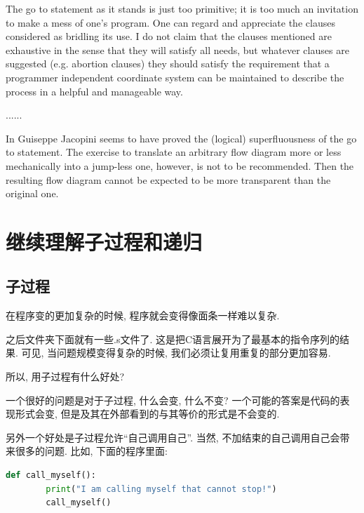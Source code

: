\begin{pas}
The go to statement as it stands is just too primitive; it is too much an invitation to make a mess of one's program. One can regard and appreciate the clauses considered as bridling its use. I do not claim that the clauses mentioned are exhaustive in the sense that they will satisfy all needs, but whatever clauses are suggested (e.g. abortion clauses) they should satisfy the requirement that a programmer independent coordinate system can be maintained to describe the process in a helpful and manageable way.

......

In  Guiseppe Jacopini seems to have proved the (logical) superfluousness of the go to statement. The exercise to translate an arbitrary flow diagram more or less mechanically into a jump-less one, however, is not to be recommended. Then the resulting flow diagram cannot be expected to be more transparent than the original one.


	
\end{pas}
 
\section{继续理解子过程和递归}

\subsection*{子过程}

在程序变的更加复杂的时候, 程序就会变得像面条一样难以复杂. 

之后文件夹下面就有一些.s文件了. 这是把C语言展开为了最基本的指令序列的结果. 可见, 当问题规模变得复杂的时候, 我们必须让复用重复的部分更加容易. 


\begin{bonus}
	所以, 用子过程有什么好处? 
\end{bonus}

一个很好的问题是对于子过程, 什么会变, 什么不变? 一个可能的答案是代码的表现形式会变, 但是及其在外部看到的与其等价的形式是不会变的. 

另外一个好处是子过程允许``自己调用自己''. 当然, 不加结束的自己调用自己会带来很多的问题. 比如, 下面的程序里面: 

\begin{lstlisting}[language=Python]
	def call_myself():
		print("I am calling myself that cannot stop!")
		call_myself()
\end{lstlisting}

